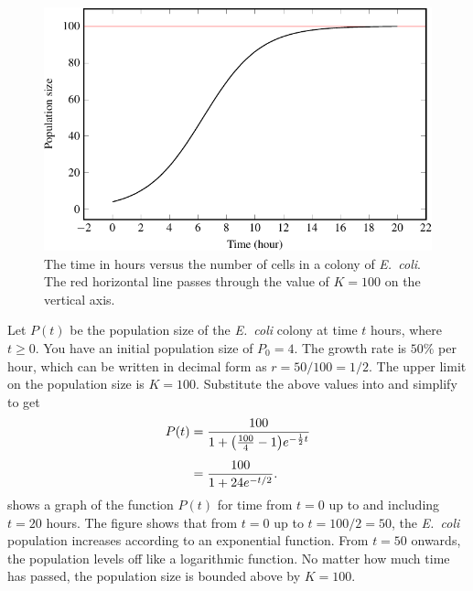 \documentclass[a4paper,oneside,12pt]{article}
\begin{document}
\begin{problem}
{\begin{solution}
\begin{figure}[!htbp]
\centering
\includegraphics[scale=1.1]{image/12/ecoli.pdf}
\caption{%
  The time in hours versus the number of cells in a colony of
  \emph{E.~coli}.  The red horizontal line passes through the value of
  $K = 100$ on the vertical axis.
}
\label{fig:logarithm:logistic_Ecoli_population}
\end{figure}

Let $P(t)$ be the population size of the \emph{E.~coli} colony at time
$t$ hours, where $t \geq 0$.  You have an initial population size of
$P_0 = 4$.  The growth rate is $50\%$ per hour, which can be written
in decimal form as $r = 50 / 100 = 1 / 2$.  The upper limit on the
population size is $K = 100$.  Substitute the above values into
 and simplify to get
\begin{align*}
P(t)
&=
\frac{
  100
}{
  1 + \parenthesis*{\frac{100}{4} - 1} e^{-\frac{1}{2}t}
} \\[4pt]
&=
\frac{
  100
}{
  1 + 24 e^{-t/2}
}.
\end{align*}
 shows a graph of the
function $P(t)$ for time from $t = 0$ up to and including $t = 20$
hours.  The figure shows that from $t = 0$ up to $t = 100/2 = 50$, the
\emph{E.~coli} population increases according to an exponential
function.  From $t = 50$ onwards, the population levels off like a
logarithmic function.  No matter how much time has passed, the
population size is bounded above by $K = 100$.


\end{solution}}
\end{problem}
\end{document}
